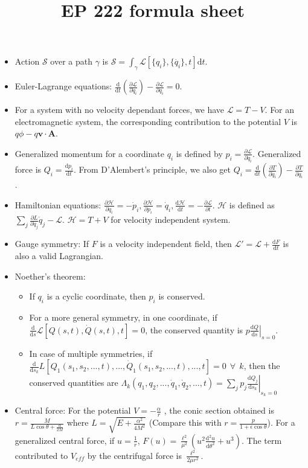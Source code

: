 \documentclass[12pt]{article}
\title{EP 222 formula sheet}
\begin{document}
\maketitle

\begin{itemize}
\item Action $\mathcal S$ over a path $\gamma$ is $\mathcal S=\int_\gamma \mathcal L[\{q_i\},\{\dot{q_i}\},t]\mathrm dt$.
\item Euler-Lagrange equations: $\frac{\mathrm d }{\mathrm dt}\left(\frac{\partial \mathcal L}{\partial \dot q_i}\right)-\frac{\partial \mathcal L}{\partial q_i}=0$.
\item For a system with no velocity dependant forces, we have $\mathcal L=T-V$. For an electromagnetic system, the corresponding contribution to the potential $V$ is $q\phi -q\mathbf v\cdot\mathbf A$.
\item Generalized momentum for a coordinate $q_i$ is defined by $p_i=\frac{\partial \mathcal L}{\partial\dot q_i}$. Generalized force is $Q_i=\frac{\mathrm d p_i}{\mathrm dt}$. From D'Alembert's principle, we also get $Q_i=\frac{\mathrm d }{\mathrm dt}\left(\frac{\partial T}{\partial \dot q_i}\right)-\frac{\partial T}{\partial q_i}$.
\item Hamiltonian equations: $\frac{\partial \mathcal H}{\partial q_i} =-\dot p_i, \frac{\partial \mathcal H}{\partial p_i}=\dot q_i,\frac{\mathrm d \mathcal H}{\mathrm d t}=-\frac{\partial \mathcal L}{\partial t}$. $\mathcal H$ is defined as $\sum\limits_j\frac{\partial L}{\partial \dot q_j}\dot q_j -\mathcal L$. $\mathcal H = T+V$ for velocity independent system. 
\item Gauge symmetry: If $F$ is a velocity independent field, then $\mathcal L'=\mathcal L+\frac{\mathrm d F}{\mathrm d t}$ is also a valid Lagrangian.
\item Noether's theorem: \begin{itemize} \item If $q_i$ is a cyclic coordinate, then $p_i$ is conserved. \item For a more general symmetry, in one coordinate, if $\frac{\mathrm d}{\mathrm ds}\mathcal L[Q(s,t),\dot Q(s,t),t]=0$, the conserved quantity is $\left. p\frac{\mathrm d Q}{\mathrm d s}\right|_{s=0}$.\item In case of multiple symmetries, if $\frac{\mathrm d}{\mathrm d s_k}L[Q_1(s_1,s_2,...,t),...,\dot Q_1(s_1,s_2,...,t),...,t]=0\:\: \forall\:\: k$, then the conserved quantities  are $\Lambda_k(q_1,q_2,...,\dot q_1,\dot q_2,...,t)=\sum\limits_j \left. p_j \frac{\mathrm d Q_j}{\mathrm d s_k}\right|_{s_k=0}$

\end{itemize}
\item Central force: For the potential $V=-\frac\alpha{r}$ , the conic section obtained is $r=\frac{M}{L\cos\theta+\frac\alpha{2M}}$ where $L=\sqrt{E+\frac{\alpha^2}{4M^2}}$ (Compare this with $r=\frac{p}{1+\epsilon \cos\theta}$). For a generalized central force, if $u=\frac1{r}$, $F(u)=\frac{\ell^2}{\mu^2}\left(u^2\frac{\mathrm d^2 u}{\mathrm d\theta^2} + u^3\right)$. The term contributed to $V_{eff}$ by the centrifugal force is $\frac{\ell^2}{2\mu r^2}$.
\end{itemize}
\end{document}
